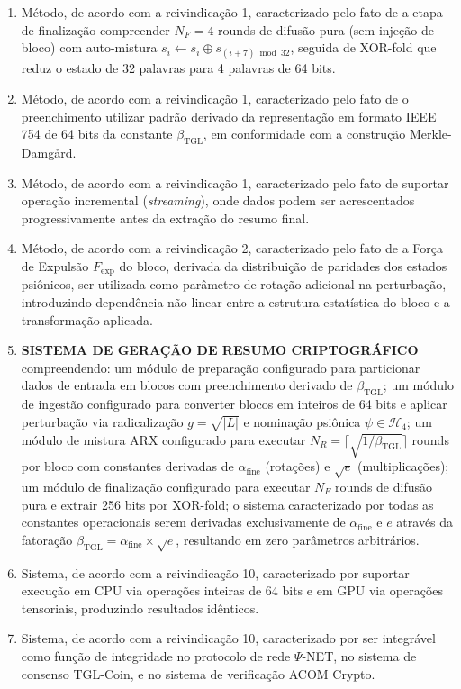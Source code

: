 \documentclass[12pt,a4paper]{article}
\newcommand{\betatgl}{\beta_{\!\scriptscriptstyle\mathrm{TGL}}}
\newcommand{\afine}{\alpha_{\mathrm{fine}}}
\begin{document}
\begin{enumerate}
\item Método, de acordo com a reivindicação 1, caracterizado pelo fato de a etapa de finalização compreender $N_F = 4$ rounds de difusão pura (sem injeção de bloco) com auto-mistura $s_i \leftarrow s_i \oplus s_{(i+7) \bmod 32}$, seguida de XOR-fold que reduz o estado de 32 palavras para 4 palavras de 64 bits.

\item Método, de acordo com a reivindicação 1, caracterizado pelo fato de o preenchimento utilizar padrão derivado da representação em formato IEEE 754 de 64 bits da constante $\betatgl$, em conformidade com a construção Merkle-Damgård.

\item Método, de acordo com a reivindicação 1, caracterizado pelo fato de suportar operação incremental (\textit{streaming}), onde dados podem ser acrescentados progressivamente antes da extração do resumo final.

\item Método, de acordo com a reivindicação 2, caracterizado pelo fato de a Força de Expulsão $F_{\mathrm{exp}}$ do bloco, derivada da distribuição de paridades dos estados psiônicos, ser utilizada como parâmetro de rotação adicional na perturbação, introduzindo dependência não-linear entre a estrutura estatística do bloco e a transformação aplicada.

\item \textbf{SISTEMA DE GERAÇÃO DE RESUMO CRIPTOGRÁFICO} compreendendo: um módulo de preparação configurado para particionar dados de entrada em blocos com preenchimento derivado de $\betatgl$; um módulo de ingestão configurado para converter blocos em inteiros de 64 bits e aplicar perturbação via radicalização $g = \sqrt{|L|}$ e nominação psiônica $\psi \in \mathcal{H}_4$; um módulo de mistura ARX configurado para executar $N_R = \lceil\sqrt{1/\betatgl}\rceil$ rounds por bloco com constantes derivadas de $\afine$ (rotações) e $\sqrt{e}$ (multiplicações); um módulo de finalização configurado para executar $N_F$ rounds de difusão pura e extrair 256 bits por XOR-fold; o sistema caracterizado por todas as constantes operacionais serem derivadas exclusivamente de $\afine$ e $e$ através da fatoração $\betatgl = \afine \times \sqrt{e}$, resultando em zero parâmetros arbitrários.

\item Sistema, de acordo com a reivindicação 10, caracterizado por suportar execução em CPU via operações inteiras de 64 bits e em GPU via operações tensoriais, produzindo resultados idênticos.

\item Sistema, de acordo com a reivindicação 10, caracterizado por ser integrável como função de integridade no protocolo de rede $\Psi$-NET, no sistema de consenso TGL-Coin, e no sistema de verificação ACOM Crypto.
\end{enumerate}
\end{document}
